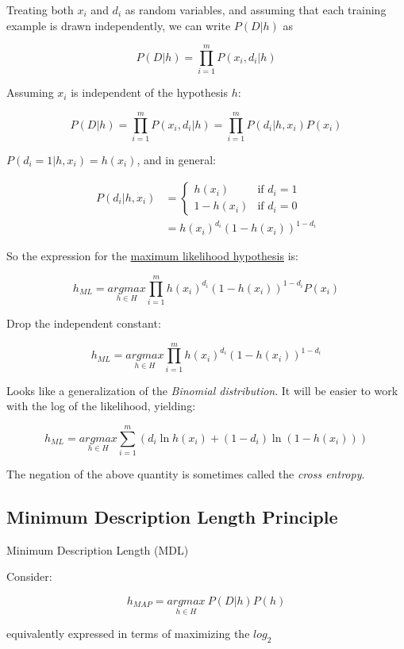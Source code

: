 Treating both \(x_i\) and \(d_i\) as random variables, and assuming that
each training example is drawn independently, we can write \(P(D|h)\) as

\[P(D|h)=\prod_{i=1}^mP(x_i,d_i|h)\]

Assuming \(x_i\) is independent of the hypothesis \(h\):

\[P(D|h)=\prod_{i=1}^mP(x_i,d_i|h)=\prod_{i=1}^mP(d_i|h,x_i)P(x_i)\]

\(P(d_i=1|h,x_i)=h(x_i)\), and in general:

\begin{equation*}
\begin{aligned}
P(d_i|h,x_i)&=\begin{cases}
h(x_i) & \text{if }d_i=1\\
1-h(x_i) & \text{if }d_i=0
\end{cases}\\
&=h(x_i)^{d_i}(1-h(x_i))^{1-d_i}
\end{aligned}
\end{equation*}

So the expression for the \ul{maximum likelihood hypothesis} is:

\[h_{ML}=\underset{h\in H}{argmax}\prod_{i=1}^mh(x_i)^{d_i}(1-h(x_i))^{1-d_i}P(x_i)\]

Drop the independent constant:

\[h_{ML}=\underset{h\in H}{argmax}\prod_{i=1}^mh(x_i)^{d_i}(1-h(x_i))^{1-d_i}\]

Looks like a generalization of the \emph{Binomial distribution}. It will
be easier to work with the log of the likelihood, yielding:

\[h_{ML}=\underset{h\in H}{argmax}\sum_{i=1}^m(d_i\ln h(x_i)+(1-d_i)\ln(1-h(x_i)))\]

The negation of the above quantity is sometimes called the \emph{cross
entropy}.

\hypertarget{minimum-description-length-principle}{%
\subsection{Minimum Description Length
Principle}\label{minimum-description-length-principle}}

Minimum Description Length (MDL)

Consider:

\[h_{MAP}=\underset{h\in H}{argmax}\ P(D|h)P(h)\]

equivalently expressed in terms of maximizing the \(log_2\)


